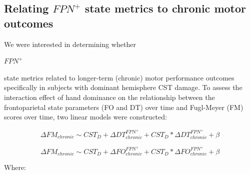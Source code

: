 \documentclass[phd,tocprelim]{cornell}
\begin{document}
	 \subsection*{Relating $FPN^+$ state metrics to chronic motor  outcomes}
     We were interested in determining whether \begin{Large}$FPN^+$\end{Large} state metrics related to longer-term (chronic) motor performance outcomes specifically in subjects with dominant hemisphere CST damage. To assess the interaction effect of hand dominance on the relationship between the frontoparietal state parameters (FO and DT) over time and Fugl-Meyer (FM) scores over time, two linear models were constructed:

     \begin{center}
      \begin{Large}
	 \begin{equation}
	    \Delta FM_{chronic} \sim  CST_D + \Delta DT^{FPN^+}_{chronic} + CST_D*\Delta DT^{FPN^+}_{chronic} + \beta
	\end{equation} 

	 \begin{equation}
	    \Delta FM_{chronic} \sim  CST_D + \Delta FO^{FPN^+}_{chronic} + CST_D*\Delta FO^{FPN^+}_{chronic} + \beta  
	\end{equation}
		\end{Large}
	\end{center}

	Where:
	
\end{document}
